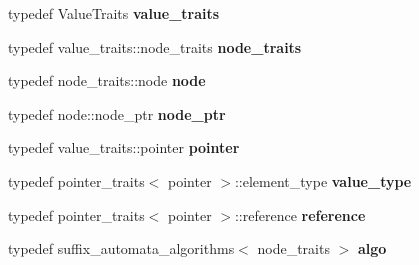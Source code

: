 \begin{DoxyCompactItemize}
\item 
\mbox{\label{classboost_1_1intrusive_1_1suffix__automata__impl_abbf3dee8caf18613db903931801c6076}} 
typedef Value\+Traits {\bfseries value\+\_\+traits}
\item 
\mbox{\label{classboost_1_1intrusive_1_1suffix__automata__impl_a3bf4d50a1aa7e13e6d6ded62d04a0296}} 
typedef value\+\_\+traits\+::node\+\_\+traits {\bfseries node\+\_\+traits}
\item 
\mbox{\label{classboost_1_1intrusive_1_1suffix__automata__impl_aac9100fcc3cc6612fb962b4eb07e48ff}} 
typedef node\+\_\+traits\+::node {\bfseries node}
\item 
\mbox{\label{classboost_1_1intrusive_1_1suffix__automata__impl_ab2d4128c7fc9c5ba87fa9eb5d50c318a}} 
typedef node\+::node\+\_\+ptr {\bfseries node\+\_\+ptr}
\item 
\mbox{\label{classboost_1_1intrusive_1_1suffix__automata__impl_aa30039fa797b95a84660985ab506f6ef}} 
typedef value\+\_\+traits\+::pointer {\bfseries pointer}
\item 
\mbox{\label{classboost_1_1intrusive_1_1suffix__automata__impl_afc35e3e13adbae16ac9bfb049d719cd2}} 
typedef pointer\+\_\+traits$<$ pointer $>$\+::element\+\_\+type {\bfseries value\+\_\+type}
\item 
\mbox{\label{classboost_1_1intrusive_1_1suffix__automata__impl_a65352a440751b963521c55774953f0e4}} 
typedef pointer\+\_\+traits$<$ pointer $>$\+::reference {\bfseries reference}
\item 
\mbox{\label{classboost_1_1intrusive_1_1suffix__automata__impl_afa6f98d48851586ded5a3141789336d7}} 
typedef suffix\+\_\+automata\+\_\+algorithms$<$ node\+\_\+traits $>$ {\bfseries algo}
\item 

\end{DoxyCompactItemize}
